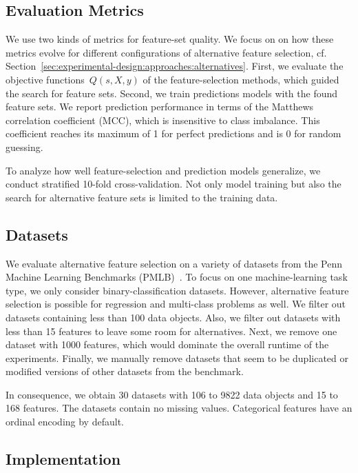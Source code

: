 \documentclass{article}
\theoremstyle{definition}
\begin{document}
\subsection{Evaluation Metrics}
\label{sec:experimental-design:evaluation}

We use two kinds of metrics for feature-set quality.
We focus on on how these metrics evolve for different configurations of alternative feature selection, cf. Section~\ref{sec:experimental-design:approaches:alternatives}.
First, we evaluate the objective functions~$Q(s,X,y)$ of the feature-selection methods, which guided the search for feature sets.
Second, we train predictions models with the found feature sets.
We report prediction performance in terms of the Matthews correlation coefficient (MCC), which is insensitive to class imbalance.
This coefficient reaches its maximum of 1 for perfect predictions and is 0 for random guessing.

To analyze how well feature-selection and prediction models generalize, we conduct stratified 10-fold cross-validation.
Not only model training but also the search for alternative feature sets is limited to the training data.

\subsection{Datasets}
\label{sec:experimental-design:datasets}

We evaluate alternative feature selection on a variety of datasets from the Penn Machine Learning Benchmarks (PMLB)~\cite{olson2017pmlb,romano2021pmlb}.
To focus on one machine-learning task type, we only consider binary-classification datasets.
However, alternative feature selection is possible for regression and multi-class problems as well.
We filter out datasets containing less than 100 data objects.
Also, we filter out datasets with less than 15 features to leave some room for alternatives.
Next, we remove one dataset with 1000 features, which would dominate the overall runtime of the experiments.
Finally, we manually remove datasets that seem to be duplicated or modified versions of other datasets from the benchmark.

In consequence, we obtain 30 datasets with 106 to 9822 data objects and 15 to 168 features.
The datasets contain no missing values.
Categorical features have an ordinal encoding by default.

\subsection{Implementation}
\label{sec:experimental-design:implementation}
\end{document}
